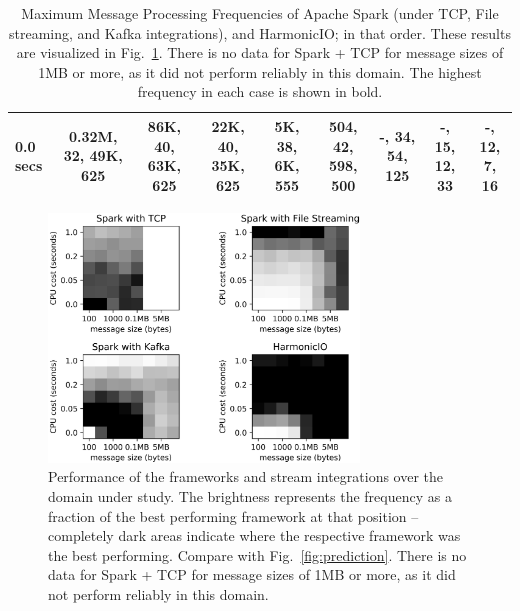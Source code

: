 \documentclass[conference]{IEEEtran}
\begin{document}
\begin{table}
\begin{center}
\begin{tabular}{|l||c|c|c|c|c|c|c|c|}
0.0 secs  & \textbf{0.32M}, 32, 49K, 625 & \textbf{86K}, 40, 63K, 625 & 22K, 40, \textbf{35K}, 625 & 5K, 38, \textbf{6K}, 555 & 504, 42, \textbf{598}, 500 & -, 34, 54, \textbf{125} & -, 15, 12, \textbf{33} & -, 12, 7, \textbf{16} \\
\hline

\end{tabular}
\end{center}
\caption{Maximum Message Processing Frequencies of Apache Spark (under TCP, File streaming, and Kafka integrations), and HarmonicIO; in that order. These results are visualized in Fig.~\ref{fig:blackblobs}. There is no data for Spark + TCP for message sizes of 1MB or more, as it did not perform reliably in this domain. The highest frequency in each case is shown in bold.}
\label{table:results}
\end{table}

\begin{figure}[h]
\begin{center}
\includegraphics[width=8.25cm]{images/4-greyscales.png}
\end{center}
\caption{Performance of the frameworks and stream integrations over the domain under study. 
The brightness represents the frequency as a fraction of the best performing framework at that position --
completely dark areas indicate where the respective framework was the best performing. Compare with Fig.~\ref{fig:prediction}. There is no data for Spark + TCP for message sizes of 1MB or more, as it did not perform reliably in this domain.}
\label{fig:blackblobs}
\end{figure}
\end{document}
